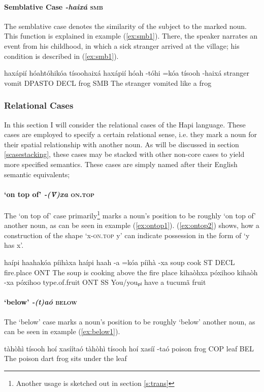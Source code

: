 \documentclass[a4paper, 12pt, oneside]{memoir}
\newcommand{\emh}[1]{\textit{#1}}
\begin{document}
\paragraph{Semblative Case \emh{-haixá} \textsc{smb}}
The semblative case denotes the similarity of the subject to the marked noun. This function is explained in example (\ref{ex:smb1}). There, the speaker narrates an event from his childhood, in which a sick stranger arrived at the village; his condition is described in (\ref{ex:smb1}).
\begin{examples}
\ex \label{ex:smb1}
\words haxápií hóahtóhikóa tísoohaixá
\bits haxápií hóah -tóhi =kóa tísooh -haixá
\gloss stranger vomit DPASTO DECL frog SMB 
\tr The stranger vomited like a frog
\end{examples}
\subsubsection{Relational Cases}\label{srelcase}
In this section I will consider the relational cases of the Hapi language. These cases are employed to specify a certain relational sense, i.e. they mark a noun for their spatial relationship with another noun. As will be discussed in section \ref{scasestacking}, these cases may be stacked with other non-core cases to yield more specified semantics. These cases are simply named after their English semantic equivalents;
\paragraph{`on top of' \emh{-(V̀)xa} \textsc{on.top} }
The `on top of' case primarily\footnote{Another usage is sketched out in section \ref{s:trans}} marks a noun's position to be roughly `on top of' another noun, as can be seen in example (\ref{ex:ontop1}). (\ref{ex:ontop2}) shows, how a construction of the shape `x-\textsc{on.top} y' can indicate possession in the form of `y has x'.
\begin{examples}
\ex \label{ex:ontop1}
\words haípi haahakóa píihàxa
\bits haípi haah -a =kóa píihà -xa
\gloss soup cook ST DECL fire.place ONT
\tr The soup is cooking above the fire place
\ex \label{ex:ontop2}
\words kihaòhxa póxihoo
\bits kihaòh -xa póxihoo
\gloss type.of.fruit ONT SS
\tr You/youₚₗ have a tucumã fruit
\end{examples}
\paragraph{`below' \emh{-(t)aó} \textsc{below}}
The `below' case marks a noun's position to be roughly `below' another noun, as can be seen in example (\ref{ex:below1}).
\begin{examples}
\ex \label{ex:below1}
\words tàhòhì tísooh hoí xasíítaó
\bits tàhòhì tísooh hoí xasíí -taó
\gloss poison frog COP leaf BEL
\tr The poison dart frog sits under the leaf
\end{examples}
\end{document}

